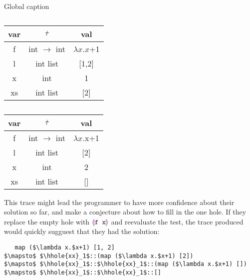 \begin{table}[!htb]
  \label{tabx}
  \caption{Global caption}
  \begin{subtable}{.6\linewidth}
      \centering
      \caption{}
          \begin{tabular}{c|c|c}
      var & $\dot{\tau}$ & val\\
      \hline
      f & int $\to$ int & $\lambda x.x$+1\\
      l & int list & [1,2]\\
      x & int & 1\\
      xs & int list & [2]\\
    \end{tabular}
    \end{subtable}%
    \begin{subtable}{.6\linewidth}
      \centering
      \caption{}
    \begin{tabular}{c|c|c}
      var & $\dot{\tau}$ & val\\
      \hline
      f & int $\to$ int & $\lambda x.$x+1\\
      l & int list & [2]\\
      x & int & 2\\
      xs & int list & []\\
    \end{tabular}
    \end{subtable}
\end{table}

This trace might lead the programmer to have more confidence about their
solution so far, and make a conjecture about how to fill in the one
hole. If they replace the empty hole with $\textcolor{violet}{\llparenthesis}\texttt{f x}\textcolor{violet}{\rrparenthesis}$ and
reevaluate the test, the trace produced would quickly sugguest that they
had the solution:
\begin{lstlisting}
   map ($\lambda x.$x+1) [1, 2]
$\mapsto$ $\hhole{xx}_1$::(map ($\lambda x.$x+1) [2])
$\mapsto$ $\hhole{xx}_1$::$\hhole{xx}_1$::(map ($\lambda x.$x+1) [])
$\mapsto$ $\hhole{xx}_1$::$\hhole{xx}_1$::[]
\end{lstlisting}
